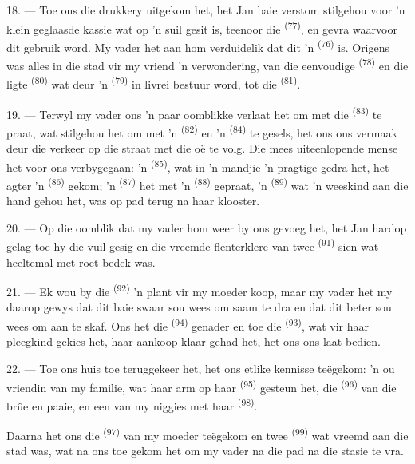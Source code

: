 \VUsaut{3.0mm}

18. --- Toe ons die drukkery uitgekom het, het Jan baie verstom stilgehou voor 'n klein
geglaasde kassie wat op 'n suil gesit is, teenoor die 
\textsuperscript{(77)}, en gevra waarvoor dit gebruik word. My vader het aan hom
verduidelik dat dit 'n  \textsuperscript{(76)} is. Origens was alles
in die stad vir my vriend 'n verwondering, van die eenvoudige 
\textsuperscript{(78)} en die ligte  \textsuperscript{(80)} wat
deur 'n  \textsuperscript{(79)} in livrei bestuur word, tot die
 \textsuperscript{(81)}.

19. --- Terwyl my vader ons 'n paar oomblikke verlaat het om met die
 \textsuperscript{(83)} te praat, wat stilgehou het om met 'n
 \textsuperscript{(82)} en 'n  \textsuperscript{(84)} te
gesels, het ons ons vermaak deur die verkeer op die straat met die oë te volg. Die mees
uiteenlopende mense het voor ons verbygegaan: 'n 
\textsuperscript{(85)}, wat in 'n mandjie 'n pragtige  gedra het, het
agter 'n  \textsuperscript{(86)} gekom; 'n
 \textsuperscript{(87)} het met 'n 
\textsuperscript{(88)} gepraat, 'n  \textsuperscript{(89)} wat 'n weeskind
aan die hand gehou het, was op pad terug na haar klooster.

\VUsaut{3.0mm}

20. --- Op die oomblik dat my vader hom weer by ons gevoeg het, het Jan hardop gelag toe
hy die vuil gesig en die vreemde flenterklere van twee 
\textsuperscript{(91)} sien wat heeltemal met roet bedek was.

21. --- Ek wou by die  \textsuperscript{(92)} 'n plant vir my
moeder koop, maar my vader het my daarop gewys dat dit baie swaar sou wees om saam te dra
en dat dit beter sou wees om  aan te skaf. Ons het die
 \textsuperscript{(94)} genader en toe die 
\textsuperscript{(93)}, wat vir haar pleegkind gekies het, haar aankoop klaar gehad het,
het ons ons laat bedien.

22. --- Toe ons huis toe teruggekeer het, het ons etlike kennisse teëgekom: 'n ou
vriendin van my familie, wat haar arm op haar 
\textsuperscript{(95)} gesteun het, die  \textsuperscript{(96)} van die
brûe en paaie, en een van my niggies met haar 
\textsuperscript{(98)}.

Daarna het ons die  \textsuperscript{(97)} van my moeder teëgekom en
twee  \textsuperscript{(99)} wat vreemd aan die stad was, wat na ons toe
gekom het om my vader na die pad na die stasie te vra.
\VUsaut{6.0mm}
\VUfilet{22mm}
